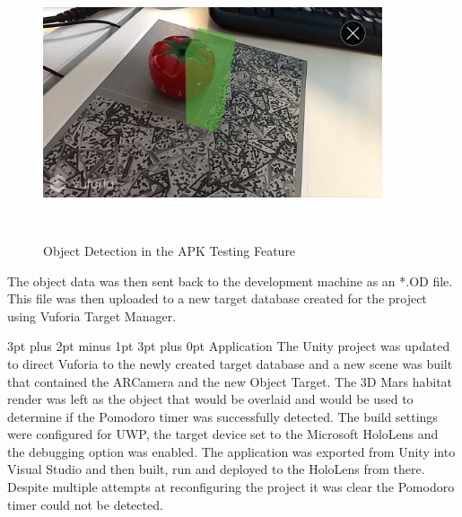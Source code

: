 \documentclass[12pt,a4paper,oneside]{article}
\makeatletter
\renewcommand\paragraph{\@startsection {paragraph}{1}{0mm} %
	                           {3pt plus 2pt minus 1pt} %
	                           {3pt plus 0pt} %
	                           {\normalfont}}
\makeatother
\begin{document}
\begin{figure}[!h]
	\centering
	\includegraphics[width=10cm,height=8cm,keepaspectratio]{images/detection}
	\caption[Detection in APK Test]{Object Detection in the APK Testing Feature}
	\label{fig_detection}
\end{figure}

The object data was then sent back to the development machine as an *.OD file. This file was then uploaded to a new target database created for the project using Vuforia Target Manager.

\paragraph{Application}
The Unity project was updated to direct Vuforia to the newly created target database and a new scene was built that contained the ARCamera and the new Object Target. The 3D Mars habitat render was left as the object that would be overlaid and would be used to determine if the Pomodoro timer was successfully detected. The build settings were configured for UWP, the target device set to the Microsoft HoloLens and the debugging option was enabled. The application was exported from Unity into Visual Studio and then built, run and deployed to the HoloLens from there. Despite multiple attempts at reconfiguring the project it was clear the Pomodoro timer could not be detected.
\end{document}
